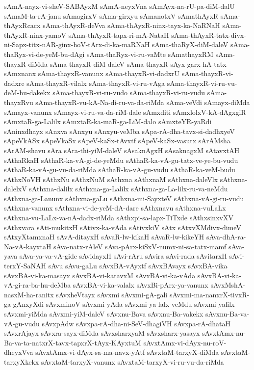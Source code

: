 {sAmA-nayx-vi-sheV-SABAyxM
sAmA-neyxVna
sAmAyx-na-rU-pa-diM-dalU
sAmaM-ta-rA-janu
sAmagirxV
sAma-girxyu
sAmanotxV
sAmathAyxR
sAma-thAyxRcacx
sAma-thAyxR-deVva
sAma-thAyxR-ninx-tayx-ka-NaRNaH
sAma-thAyxR-ninx-yamoV
sAma-thAyxR-tapx-ri-mA-NataH
sAma-thAyxR-tatx-divx-ni-Sapx-titx-nAR-ginx-hoV-tArx-di-ka-maRNaH
sAma-thaRyX-diM-daleV
sAma-thaRyx-vi-de-yeM-bu-dAgi
sAma-thaRyx-vi-ru-vaMte
sAmathayxRM
sAma-thayxR-diMda
sAma-thayxR-diM-daleV
sAma-thayxR-sAyx-garx-hA-tatx-sAmxnanx
sAma-thayxR-vanunx
sAma-thayxR-vi-dadxrU
sAma-thayxR-vi-dadxre
sAma-thayxR-vilalx
sAma-thayxR-vi-ru-vAga
sAma-thayxR-vi-ru-vu-deM-bu-dakekx
sAma-thayxR-vi-ru-vudo
sAma-thayxR-vi-ru-vudu
sAma-thayxRvu
sAma-thayxR-vu-kA-Na-di-ru-va-da-riMda
sAma-veVdi
sAmayx-diMda
sAmayx-vanunx
sAmayx-vi-ru-va-da-riM-dale
sAmxditi
sAmxlolxV-kA-dAgxgiR
sAmxtaR-ga-Lalilx
sAmxtaR-ka-maR-ga-LiM-dalo
sAmxteYR-yaRdi
sAninxdhayx
sAnxva
sAnxyu
sAnxyu-veMba
sApa-rA-dha-tavx-si-dadhxyeV
sApeVkASx
sApeVkaSx
sApeV-kaSx-tAvxtf
sApeV-kaSx-vasutx
sArAMsha
sArAM-shavu
sAra
sAra-thi-yiM-daleV
sAsaknAgxH
sAsaknagxM
sAtavxtAH
sAthaRkaH
sAthaR-ka-vA-gi-de-yeMdu
sAthaR-ka-vA-gu-tatx-ve-ye-bu-vudu
sAthaR-ka-vA-gu-vu-da-riMda
sAthaR-ka-vA-gu-vudu
sAthaR-ka-veM-budu
sAthxNoVH
sAthxNu
sAthxNuM
sAthxna
sAthxnaM
sAthxna-daleVlx
sAthxna-dalelxV
sAthxna-dalilx
sAthxna-ga-Lalilx
sAthxna-ga-La-lilx-ru-va-neMdu
sAthxna-ga-Lanunx
sAthxna-gaLu
sAthxna-mi-SayxteV
sAthxna-vA-gi-ru-vudu
sAthxna-vanunx
sAthxna-vi-de-yeM-dA-dare
sAthxnavu
sAthxna-vuLaLx
sAthxna-vu-LaLx-va-nA-dadx-riMda
sAthxpi-sa-lapx-TiTxde
sAthxsinxvXV
sAthxvara
sAti-mukitxH
sAtivx-ka-vAda
sAtivxkiV
sAtx
sAtxvXMdivx-dimeV
sAtxyXtamxnaH
sAvA-ditayxH
sAvaR-lw-kikaH
sAvaR-lw-kikeYH
sAva-dhA-ra-Na-vA-kayxtaH
sAva-natx-rAleV
sAva-pArx-kiSxV-numx-ni-sa-tatx-mamf
sAva-yava
sAva-ya-va-vA-gide
sAvidayxH
sAvi-rAru
sAvira
sAvi-rada
sAvitarxH
sAvi-terxY-SaNAH
sAvu
sAvu-gaLu
sAvxBA-vAyxtf
sAvxBAvayx
sAvxBA-vika
sAvxBA-vi-ka-masayx
sAvxBA-vi-katavxM
sAvxBA-vi-ka-vAda
sAvxBA-vi-ka-vA-gi-ra-ba-hu-deMba
sAvxBA-vi-ka-valalx
sAvxBi-pArx-ya-vanunx
sAvxMshA-nasxM-ha-ranitx
sAvxheVtayx
sAvxmi
sAvxmi-gA-gali
sAvxmi-ma-nanxrX-tivxR-ga-gAnxyXdi
sAvxminoV
sAvxmi-yAda
sAvxmi-ya-lalx-veMdu
sAvxmi-yalilx
sAvxmi-yiMda
sAvxmi-yiM-daleV
sAvxnu-Bava
sAvxnu-Ba-vakekx
sAvxnu-Ba-va-vA-gu-vudu
sAvxpAdw
sAvxpa-rA-dha-ni-SeV-dhagiVH
sAvxpa-rA-dhataH
sAvxrAjayx
sAvxra-sayx-diMda
sAvxsharxyaM
sAvxsharx-yasayx
sAvxtAmx-nu-Ba-va-ta-natxrX-tavx-tapxrX-tAyx-KAyxtuM
sAvxtAmx-vi-dAyx-nu-roV-dheyxVva
sAvxtAmx-vi-dAyx-sa-ma-navx-yAtf
sAvxtaM-tarxyX-diMda
sAvxtaM-tarxyXkekx
sAvxtaM-tarxyX-vanunx
sAvxtaM-tarxyX-vi-ru-vu-da-riMda
}
